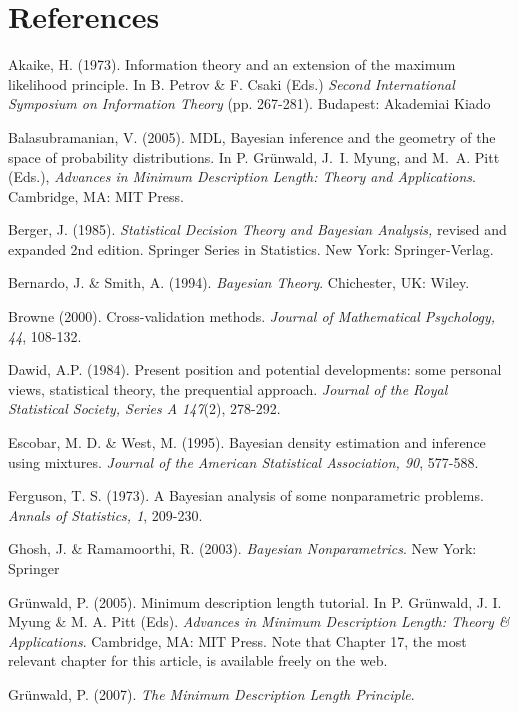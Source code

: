\documentclass[authoryear]{elsarticle}
\begin{document}
\section*{References}
\vspace*{2pt}
\begin{list}{}{\setlength{\leftmargin}{12pt}\setlength{\itemindent}{-12pt}
\setlength{\parsep}{0pt}}
\item Akaike, H. (1973). Information theory and an extension of the maximum
  likelihood principle. In B. Petrov \& F. Csaki (Eds.) {\it Second International
  Symposium on Information Theory} (pp. 267-281). Budapest: Akademiai Kiado
\item Balasubramanian, V. (2005). {MDL}, {B}ayesian inference and the
  geometry of the space of probability distributions. In
  P. Gr\"unwald, J.~I. Myung, and M.~A. Pitt (Eds.), {\em Advances
    in Minimum Description Length: Theory and Applications}.
  Cambridge, MA: MIT Press.
\item Berger, J. (1985).
{\em Statistical Decision Theory and {B}ayesian Analysis,} revised
  and expanded 2nd edition. Springer Series in Statistics. New York: Springer-Verlag.
\item Bernardo, J. \& Smith, A. (1994). {\it Bayesian
  Theory}. Chichester, UK: Wiley.
\item Browne (2000). Cross-validation methods. {\it Journal
of Mathematical Psychology, 44}, 108-132.
\item Dawid, A.P. (1984). Present position and potential developments:
  some personal views, statistical theory, the prequential approach.
  {\em Journal of the Royal Statistical Society, Series A 147\/}(2), 278-292.
\item Escobar, M. D. \& West, M. (1995). Bayesian density estimation and
  inference using mixtures. {\it Journal of the American Statistical Association, 90},
  577-588.
\item Ferguson, T. S. (1973). A Bayesian analysis of some nonparametric problems.
  {\it Annals of Statistics, 1}, 209-230.
\item Ghosh, J. \& Ramamoorthi, R. (2003). {\it Bayesian Nonparametrics}.
  New York: Springer
\item Gr\"{u}nwald, P. (2005). Minimum description length tutorial. In P. Gr\"{u}nwald,
  J. I. Myung \& M. A. Pitt (Eds). {\it Advances in Minimum Description Length: Theory
  \& Applications}. Cambridge, MA: MIT Press. Note that Chapter 17,
the most relevant chapter for this article, is available freely on the
web.
\item Gr\"{u}nwald, P. (2007). {\it The Minimum Description Length Principle}.

\end{list}
\end{document}
